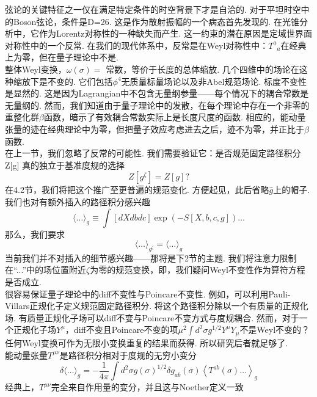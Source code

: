弦论的关键特征之一仅在满足特定条件的时空背景下才是自洽的. 对于平坦时空中的Boson弦论，条件是D=26. 这是作为散射振幅的一个病态首先发现的. 在光锥分析中，它作为Lorentz对称性的一种缺失而产生. 这一约束的潜在原因是定域世界面对称性中的一个反常. 在我们的现代体系中，反常是在Weyl对称性中：${T^a}_a$在经典上为零，但在量子理论中不是. \\
整体Weyl变换，$\omega(\sigma)=$ 常数，等价于长度的总体缩放. 几个四维中的场论在这种缩放下是不变的. 它们包括$\phi^4$无质量标量场论以及非Abel规范场论. 标度不变性是显然的. 这是因为Lagrangian中不包含无量纲参量——每个情况下的耦合常数是无量纲的. 然而，我们知道由于量子理论中的发散，在每个理论中存在一个非零的重整化群$\beta$函数，暗示了有效耦合常数实际上是长度尺度的函数. 相应的，能动量张量的迹在经典理论中为零，但把量子效应考虑进去之后，迹不为零，并正比于$\beta$函数. \\
在上一节，我们忽略了反常的可能性. 我们需要验证它：是否规范固定路径积分Z[g] 真的独立于基准度规的选择
\begin{equation}
Z\left[g^{\zeta}\right]=Z[g] ?
\end{equation}
在4.2节，我们将把这个推广至更普遍的规范变化. 方便起见，此后省略$\hat{g}$上的帽子. 我们也对有额外插入的路径积分感兴趣
\begin{equation}
\langle\ldots\rangle_{g} \equiv \int[d X d b d c] \exp (-S[X, b, c, g]) \ldots
\end{equation}
那么，我们要求
\begin{equation}
\langle\ldots\rangle_{g ^\zeta}=\langle\ldots\rangle_{g}
\end{equation}
当前我们并不对插入的细节感兴趣——那将是下2节的主题. 我们将注意力限制在“...”中的场位置附近$\zeta$为零的规范变换，即，我们疑问Weyl不变性作为算符方程是否成立.\\
很容易保证量子理论中的diff不变性与Poincare不变性. 例如，可以利用Pauli-Villars正规化子定义规范固定路径积分. 将这个路径积分除以一个有质量的正规化场. 有质量正规化子场可以diff不变与Poincare不变方式与度规耦合. 然而，对于一个正规化子场$Y^\mu$，diff不变且Poincare不变的项$\mu^{2} \int d^{2} \sigma g^{1 / 2} Y^{\mu} Y_{\mu}$不是Weyl不变的？任何Weyl变换可作为无限小变换重复的结果而获得. 所以研究后者就足够了.\\
能动量张量$T^{\mu\nu}$是路径积分相对于度规的无穷小变分
\begin{equation}\label{3.4.4}
\delta\langle\ldots\rangle_{g}=-\frac{1}{4 \pi} \int d^{2} \sigma g(\sigma)^{1 / 2} \delta g_{a b}(\sigma)\left\langle T^{a b}(\sigma) \ldots\right\rangle_{g}
\end{equation}
经典上，$T^{\mu\nu}$完全来自作用量的变分，并且这与Noether定义一致
